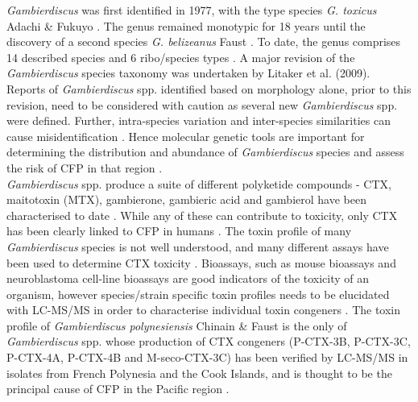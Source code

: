 \documentclass[12pt]{article}
\begin{document}
\emph{Gambierdiscus} was first identified in 1977, with the type species \emph{G. toxicus} Adachi \& Fukuyo \citep{adachi1979thecal}. 
The genus remained monotypic for 18 years until the discovery of a second species \emph{G. belizeanus} Faust \citep{faust1995observation}. 
To date, the genus comprises 14 described species and 6 ribo/species types
 \citep{smith2016new,fraga2016gambierdiscus,litaker2010global,adachi1979thecal,faust1995observation,chinain1999morphology,litaker2009taxonomy,dai2017taxonomic,nishimura2014morphology,rhodes2017new,kretzschmar2017characterization,fraga2011gambierdiscus,xu2014distribution,fraga2014genus} .
A major revision of the \emph{Gambierdiscus} species taxonomy was undertaken by Litaker et al. (2009). 
Reports of \emph{Gambierdiscus} spp. identified based on morphology alone, prior to this revision, need to be considered with caution as several new \emph{Gambierdiscus} spp. were defined. 
Further, intra-species variation and inter-species similarities can cause misidentification \citep{bravo2014cellular,kretzschmar2017characterization,kohli2014high}. 
Hence molecular genetic tools are important for determining the distribution and abundance of  \textit{Gambierdiscus} species and assess the risk of CFP in that region \citep{kohli2014high,kretzschmar2017characterization}. \\
\emph{Gambierdiscus} spp. produce a suite of different polyketide compounds - CTX, maitotoxin (MTX), gambierone, gambieric acid and gambierol have been characterised to date \citep{satake1993gambierol,nagai1992gambieric,rodriguez2015gambierone,murata1993structure,murata1989structures}. 
While any of these can contribute to toxicity, only CTX has been clearly linked to CFP in humans \citep{chinain1997intraspecific,holmes1998gambierdiscus}. 
The toxin profile of many \textit{Gambierdiscus} species is not well understood, and many different assays have been used to determine CTX toxicity \citep{globalcig}. 
Bioassays, such as mouse bioassays and neuroblastoma cell-line bioassays are good indicators of the toxicity of an organism, however species/strain specific toxin profiles needs to be elucidated with LC-MS/MS in order to characterise individual toxin congeners \citep{diogened2014chemistry}. 
The toxin profile of \textit{Gambierdiscus polynesiensis} Chinain \& Faust is the only of \emph{Gambierdiscus} spp.
whose production of CTX congeners (P-CTX-3B, P-CTX-3C, P-CTX-4A, P-CTX-4B and M-seco-CTX-3C) has been verified by LC-MS/MS in isolates from French Polynesia and the Cook Islands, and is thought to be the principal cause of CFP in the Pacific region \citep{chinain2010growth,rhodes2014production}. 
\end{document}
